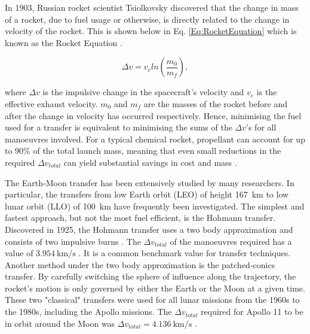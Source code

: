 \documentclass[10pt,twocolumn]{revtex4-2}    %
\begin{document}
\vspace{0.5em}

In 1903, Russian rocket scientist Tsiolkovsky discovered that the change in mass of a rocket, due to fuel usage or otherwise, is directly related to the change in velocity of the rocket. This is shown below in Eq. \ref{Eq:RocketEquation} which is known as the Rocket Equation \cite{tsiolkovsky1903}.

\begin{equation}
    \Delta v = v_{e} ln(\frac{m_{0}}{m_{f}}),
    \label{Eq:RocketEquation}
\end{equation}
\vspace{0.5em}

where $\Delta v$ is the impulsive change in the spacecraft's velocity and $v_{e}$ is the effective exhaust velocity. $m_{0}$ and $m_{f}$ are the masses of the rocket before and after the change in velocity has occurred respectively. Hence, minimising the fuel used for a transfer is equivalent to minimising the sums of the $\Delta v$'s for all manoeuvres involved. For a typical chemical rocket, propellant can account for up to 90\% of the total launch mass, meaning that even small reductions in the required $\Delta v_{total}$ can yield substantial savings in cost and mass \cite{nasa_rocket_equation}.

\vspace{0.5em}

The Earth-Moon transfer has been extensively studied by many researchers. In particular, the transfers from low Earth orbit (LEO) of height 167~km to low lunar orbit (LLO) of 100~km have frequently been investigated. The simplest and fastest approach, but not the most fuel efficient, is the Hohmann transfer. Discovered in 1925, the Hohmann transfer uses a two body approximation and consists of two impulsive burns \cite{Hohmann1925}. The $\Delta v_{total}$ of the manoeuvres required has a value of $3.954~\mathrm{km/s}$ \cite{Qi_Xu_2016}. It is a common benchmark value for transfer techniques. Another method under the two body approximation is the patched-conics transfer. By carefully switching the sphere of influence along the trajectory, the rocket's motion is only governed by either the Earth or the Moon at a given time. These two "classical" transfers were used for all lunar missions from the 1960s to the 1980s, including the Apollo missions. The $\Delta v_{total}$ required for Apollo 11 to be in orbit around the Moon was $\Delta v_{total} = 4.136~\mathrm{km/s}$ \cite{Riche1969}.
\end{document}
